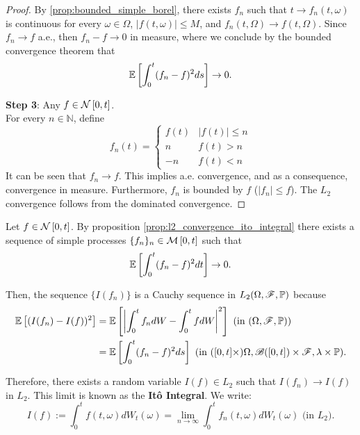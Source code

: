\documentclass[../TGMAFFIRO.tex]{subfiles}
\begin{document}
\begin{proposition}
\begin{proof}
By \ref{prop:bounded_simple_borel}, there exists $f_n$ such that $t\to f_n(t,\omega)$ is continuous for every $\omega\in\Omega$, $|f(t,\omega)|\leq M$, and $f_n(t,\Omega) \to f(t,\Omega)$. Since $f_n\to f$ a.e., then $f_n - f \to 0$ in measure, where we conclude by the bounded convergence theorem that
	\begin{equation}
		\mathbb{E}\left[\int_0^t(f_n - f)^2 ds\right] \to 0.
	\end{equation}

\textbf{Step 3}: Any $f\in\mathcal{N}\left[0, t\right]$.\\
For every $n\in\mathbb{N}$, define
	\begin{equation}
		f_n(t) = \begin{cases}
					f(t) & |f(t)|\leq n\\
					n 	 & f(t) > n \\
					-n   & f(t) < n
			     \end{cases}
	\end{equation}
It can be seen that $f_n\to f$. This implies a.e. convergence, and as a consequence, convergence in measure. Furthermore, $f_n$ is bounded by $f$ ($|f_n| \leq f$). The $L_2$ convergence follows from the dominated convergence.
\end{proof}
\end{proposition}

\begin{definition}
	Let $f\in\mathcal{N}\left[0, t\right]$. By proposition \ref{prop:l2_convergence_ito_integral} there exists a sequence of simple processes $\{f_n\}_{n} \in \mathcal{M}\left[0, t\right]$ such that
	\begin{equation}
		\mathbb{E}\left[\int_0^t (f_n - f)^2 dt\right] \to 0.
	\end{equation}
	
	Then, the sequence $\{I(f_n)\}$ is a Cauchy sequence in $L_2(\Omega, \mathscr{F}, \mathbb{P})$ because
	\begin{align*}
		\mathbb{E}\left[(I(f_n) - I(f))^2\right] &= \mathbb{E}\left[\left|\int_0^t f_n dW - \int_0^t f dW\right|^2\right] \text{ (in $(\Omega, \mathscr{F}, \mathbb{P})$)} \\
								&= \mathbb{E}\left[\int_0^t(f_n - f)^2 ds\right] \text{ (in $([0,t]\times)\Omega,\mathscr B{([0,t])}\times\mathscr{F}, \lambda\times\mathbb{P} $)}.
	\end{align*}
	
	Therefore, there exists a random variable $I(f)\in L_2$ such that $I(f_n) \to I(f)$ in $L_2$. This limit is known as the \textbf{It\^o Integral}. We write:
	\begin{equation}
		I(f) := \int_0^t f(t, \omega) dW_t(\omega) = \lim_{n\to\infty}\int_0^t f_n(t,\omega) dW_t(\omega) \text{ (in $L_2$)}.
	\end{equation}
\end{definition}
\end{document}
